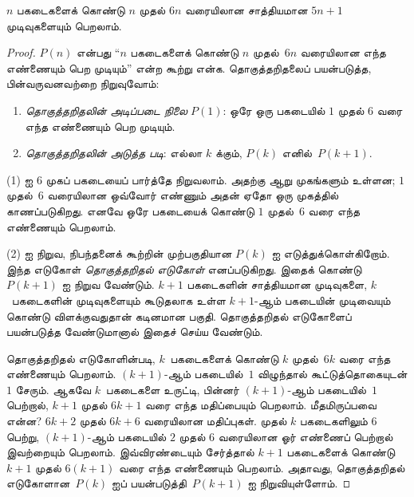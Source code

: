 \documentclass[../../../include/open-logic-section]{subfiles}
\begin{document}
\begin{thm}
  $n$ பகடைகளைக் கொண்டு $n$ முதல் $6n$
  வரையிலான சாத்தியமான $5n+1$ முடிவுகளையும்
  பெறலாம்.
\end{thm}

\begin{proof}
$P(n)$ என்பது ``$n$ பகடைகளைக் கொண்டு
$n$ முதல்~$6n$ வரையிலான எந்த எண்ணையும்
பெற முடியும்'' என்ற கூற்று என்க. தொகுத்தறிதலைப்
பயன்படுத்த, பின்வருவனவற்றை நிறுவுவோம்:
\begin{enumerate}
\item \emph{தொகுத்தறிதலின் அடிப்படை நிலை} $P(1)$:
  ஒரே ஒரு பகடையில் $1$ முதல் $6$ வரை
  எந்த எண்ணையும் பெற முடியும்.
\item \emph{தொகுத்தறிதலின் அடுத்த படி}:
  எல்லா $k$ க்கும், $P(k)$ எனில்~$P(k+1)$.
\end{enumerate}

(1) ஐ $6$ முகப் பகடையைப் பார்த்தே நிறுவலாம்.
அதற்கு ஆறு முகங்களும் உள்ளன; $1$ முதல்~$6$
வரையிலான ஒவ்வோர் எண்ணும் அதன் ஏதோ ஒரு முகத்தில்
காணப்படுகிறது. எனவே ஒரே பகடையைக் கொண்டு $1$
முதல்~$6$ வரை எந்த எண்ணையும் பெறலாம்.

(2) ஐ நிறுவ, நிபந்தனைக் கூற்றின் முற்பகுதியான
$P(k)$ ஐ எடுத்துக்கொள்கிறோம். இந்த எடுகோள்
\emph{தொகுத்தறிதல் எடுகோள்} எனப்படுகிறது.
இதைக் கொண்டு~$P(k+1)$ ஐ நிறுவ வேண்டும்.
$k+1$ பகடைகளின் சாத்தியமான முடிவுகளை,
$k$~பகடைகளின் முடிவுகளையும் கூடுதலாக உள்ள
$k+1$-ஆம் பகடையின் முடிவையும் கொண்டு
விளக்குவதுதான் கடினமான பகுதி. தொகுத்தறிதல்
எடுகோளைப் பயன்படுத்த வேண்டுமானால் இதைச்
செய்ய வேண்டும்.

தொகுத்தறிதல் எடுகோளின்படி, $k$~பகடைகளைக்
கொண்டு $k$ முதல்~$6k$ வரை எந்த எண்ணையும்
பெறலாம். $(k+1)$-ஆம் பகடையில்~$1$
விழுந்தால் கூட்டுத்தொகையுடன் $1$ சேரும்.
ஆகவே $k$~பகடைகளை உருட்டி, பின்னர்
$(k+1)$-ஆம் பகடையில்~$1$ பெற்றால்,
$k+1$ முதல் $6k+1$ வரை எந்த மதிப்பையும்
பெறலாம். மீதமிருப்பவை என்ன? $6k+2$
முதல் $6k+6$ வரையிலான மதிப்புகள்.
முதல் $k$ பகடைகளிலும் $6$ பெற்று,
$(k+1)$-ஆம் பகடையில் $2$ முதல் $6$
வரையிலான ஓர் எண்ணைப் பெற்றால் இவற்றையும்
பெறலாம். இவ்விரண்டையும் சேர்த்தால் $k+1$
பகடைகளைக் கொண்டு $k+1$ முதல் $6(k+1)$
வரை எந்த எண்ணையும் பெறலாம். அதாவது,
தொகுத்தறிதல் எடுகோளான~$P(k)$ ஐப்
பயன்படுத்தி~$P(k+1)$ ஐ நிறுவியுள்ளோம்.
\end{proof}
\end{document}
